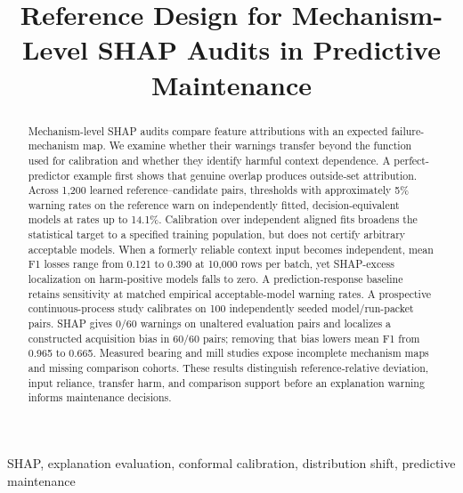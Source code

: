 \documentclass[conference]{IEEEtran}
\begin{document}
\title{Reference Design for Mechanism-Level SHAP Audits in Predictive Maintenance}
\author{
}
\maketitle
\begin{abstract}
Mechanism-level SHAP audits compare feature attributions with an expected failure-mechanism map. We examine whether their warnings transfer beyond the function used for calibration and whether they identify harmful context dependence. A perfect-predictor example first shows that genuine overlap produces outside-set attribution. Across 1,200 learned reference--candidate pairs, thresholds with approximately 5\% warning rates on the reference warn on independently fitted, decision-equivalent models at rates up to 14.1\%. Calibration over independent aligned fits broadens the statistical target to a specified training population, but does not certify arbitrary acceptable models. When a formerly reliable context input becomes independent, mean F1 losses range from 0.121 to 0.390 at 10,000 rows per batch, yet SHAP-excess localization on harm-positive models falls to zero. A prediction-response baseline retains sensitivity at matched empirical acceptable-model warning rates. A prospective continuous-process study calibrates on 100 independently seeded model/run-packet pairs. SHAP gives 0/60 warnings on unaltered evaluation pairs and localizes a constructed acquisition bias in 60/60 pairs; removing that bias lowers mean F1 from 0.965 to 0.665. Measured bearing and mill studies expose incomplete mechanism maps and missing comparison cohorts. These results distinguish reference-relative deviation, input reliance, transfer harm, and comparison support before an explanation warning informs maintenance decisions.
\end{abstract}
\begin{IEEEkeywords}
SHAP, explanation evaluation, conformal calibration, distribution shift, predictive maintenance
\end{IEEEkeywords}
\end{document}
